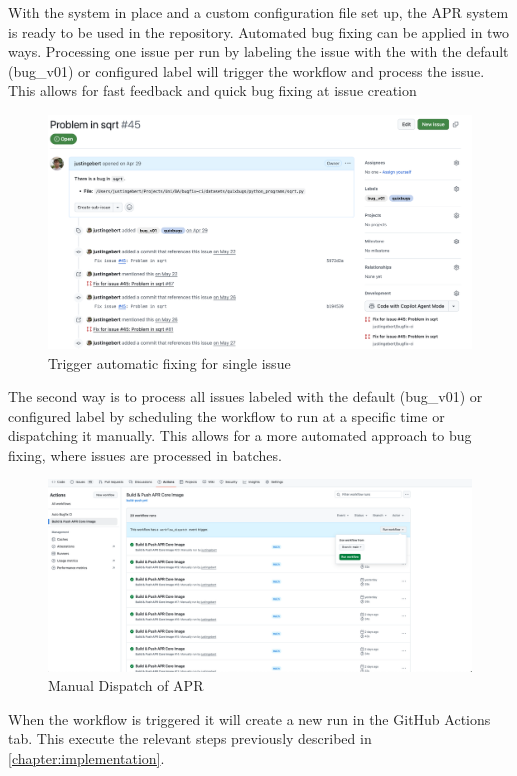 With the system in place and a custom configuration file set up, the APR system is ready to be used in the repository. Automated bug fixing can be applied in two ways.
Processing one issue per run by labeling the issue with the with the default (bug\_v01) or configured label will trigger the workflow and process the issue. This allows for fast feedback and quick bug fixing at issue creation
\begin{figure}[H]
    \centering
    \includegraphics[width=1\textwidth]{images/github/GitHub Issue.png}
    \caption{Trigger automatic fixing for single issue}
    \label{fig:issue-trigger}
\end{figure}

The second way is to process all issues labeled with the default (bug\_v01) or configured label by scheduling the workflow to run at a specific time or dispatching it manually. This allows for a more automated approach to bug fixing, where issues are processed in batches.
\begin{figure}[H]
    \centering
    \includegraphics[width=1\textwidth]{images/workflow/dispatch.png}
    \caption{Manual Dispatch of APR}
    \label{fig:dispatch}
\end{figure}

When the workflow is triggered it will create a new run in the GitHub Actions tab. This execute the relevant steps previously described in \ref{chapter:implementation}.

